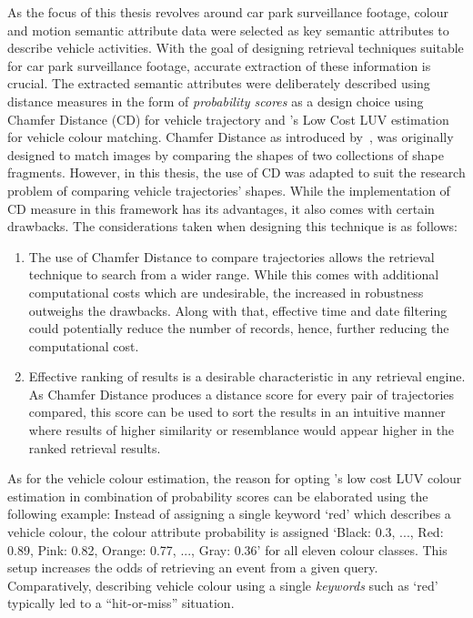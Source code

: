 As the focus of this thesis revolves around car park surveillance footage, colour and motion semantic attribute data were selected as key semantic attributes to describe vehicle activities. 
With the goal of designing retrieval techniques suitable for car park surveillance footage, accurate extraction of these information is crucial.
The extracted semantic attributes were deliberately described using distance measures in the form of \textit{probability scores} as a design choice using Chamfer Distance (CD) for vehicle trajectory and 's Low Cost LUV estimation for vehicle colour matching.
Chamfer Distance as introduced by~, was originally designed to match images by comparing the shapes of two collections of shape fragments.
However, in this thesis, the use of CD was adapted to suit the research problem of comparing vehicle trajectories' shapes. While the implementation of CD measure in this framework has its advantages, it also comes with certain drawbacks. The considerations taken when designing this technique is as follows:
\begin{enumerate}
    \item The use of Chamfer Distance to compare trajectories allows the retrieval technique to search from a wider range. While this comes with additional computational costs which are undesirable, the increased in robustness outweighs the drawbacks. Along with that, effective time and date filtering could potentially reduce the number of records, hence, further reducing the computational cost.
    \item Effective ranking of results is a desirable characteristic in any retrieval engine. As Chamfer Distance produces a distance score for every pair of trajectories compared, this score can be used to sort the results in an intuitive manner where results of higher similarity or resemblance would appear higher in the ranked retrieval results.
\end{enumerate}

As for the vehicle colour estimation, 
the reason for opting \cite{riemersma}'s low cost LUV colour estimation in combination of probability scores can be elaborated using the following example: Instead of assigning a single keyword `red' which describes a vehicle colour, the colour attribute probability is assigned `Black: 0.3, ..., Red: 0.89, Pink: 0.82, Orange: 0.77, ..., Gray: 0.36' for all eleven colour classes. This setup increases the odds of retrieving an event from a given query. Comparatively, describing vehicle colour using a single \textit{keywords} such as `red' typically led to a ``hit-or-miss'' situation.


